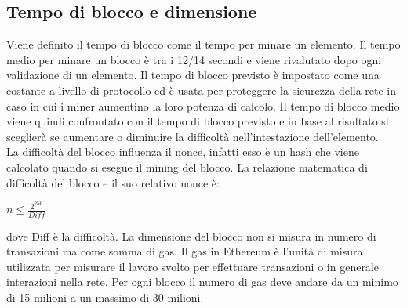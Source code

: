 \documentclass[a4paper,11pt]{report}
\begin{document}
\subsection{Tempo di blocco e dimensione}
Viene definito il tempo di blocco come il tempo per minare un elemento.
Il tempo medio per minare un blocco è tra i 12/14 secondi e viene rivalutato dopo ogni validazione di un elemento. Il tempo di blocco previsto è impostato come una costante a livello di protocollo ed è usata per proteggere la sicurezza della rete in caso in cui i miner aumentino la loro potenza di calcolo. Il tempo di blocco medio viene quindi confrontato con il tempo di blocco previsto e in base al risultato si sceglierà se aumentare o diminuire la difficoltà nell'intestazione dell'elemento.\\
La difficoltà del blocco influenza il nonce, infatti esso è un hash che viene calcolato quando si esegue il mining del blocco. La relazione matematica di difficoltà del blocco e il suo relativo nonce è:\\  \begin{center}
$n \leq \frac{2^{256}}{Diff}$
\end{center} dove Diff è la difficoltà.
La dimensione del blocco non si misura in numero di transazioni ma come somma di gas. Il gas in Ethereum è l'unità di misura utilizzata per misurare il lavoro svolto per effettuare transazioni o in generale interazioni nella rete.
Per ogni blocco il numero di gas deve andare da un minimo di 15 milioni a un massimo di 30 milioni.
\end{document}
